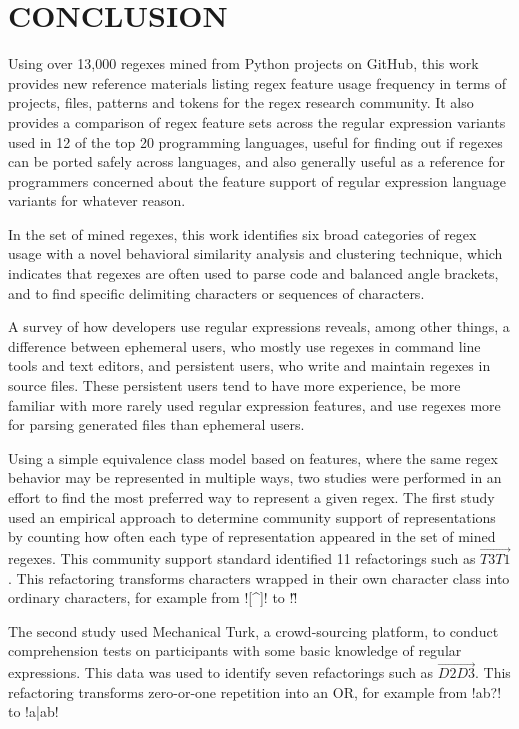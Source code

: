 \chapter{CONCLUSION}
\label{ch7}

Using over 13,000 regexes mined from Python projects on GitHub, this work provides new reference materials listing regex feature usage frequency in terms of projects, files, patterns and tokens for the regex research community.  It also provides a comparison of regex feature sets across the regular expression variants used in 12 of the top 20 programming languages, useful for finding out if regexes can be ported safely across languages, and also generally useful as a reference for programmers concerned about the feature support of regular expression language variants for whatever reason.

In the set of mined regexes, this work identifies six broad categories of regex usage with a novel behavioral similarity analysis and clustering technique, which indicates that regexes are often used to parse code and balanced angle brackets, and to find specific delimiting characters or sequences of characters.

A survey of how developers use regular expressions reveals, among other things, a difference between ephemeral users, who mostly use regexes in command line tools and text editors, and persistent users, who write and maintain regexes in source files.  These persistent users tend to have more experience, be more familiar with more rarely used regular expression features, and use regexes more for parsing generated files than ephemeral users.

Using a simple equivalence class model based on features, where the same regex behavior may be represented in multiple ways, two studies were performed in an effort to find the most preferred way to represent a given regex.  The first study used an empirical approach to determine community support of representations by counting how often each type of representation appeared in the set of mined regexes.  This community support standard identified 11 refactorings such as $\overrightarrow{T3 T1}$.  This refactoring transforms characters wrapped in their own character class into ordinary characters, for example from \cverb![^]! to \cverb!\^!

The second study used Mechanical Turk, a crowd-sourcing platform, to conduct comprehension tests on participants with some basic knowledge of regular expressions.  This data was used to identify seven refactorings such as $\overrightarrow{D2 D3}$.  This refactoring transforms zero-or-one repetition into an OR, for example from \cverb!ab?! to \cverb!a|ab!

